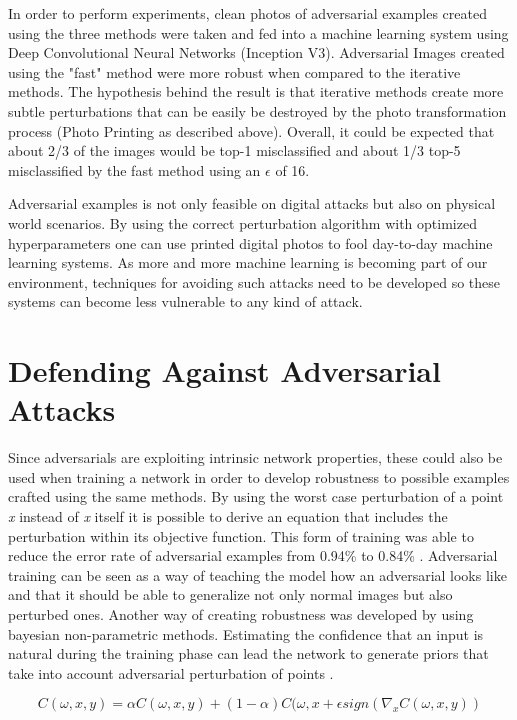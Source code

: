 In order to perform experiments, clean photos of adversarial examples created using the three methods were taken and fed into a machine learning system using Deep Convolutional Neural Networks (Inception V3). Adversarial Images created using the "fast" method were more robust when compared to the iterative methods. The hypothesis behind the result is that iterative methods create more subtle perturbations that can be easily be destroyed by the photo transformation process (Photo Printing as described above). Overall, it could be expected that about 2/3 of the images would be top-1 misclassified and about 1/3 top-5 misclassified by the fast method using an $\epsilon$ of 16.

Adversarial examples is not only feasible on digital attacks but also on physical world scenarios. By using the correct perturbation algorithm with optimized hyperparameters one can use printed digital photos to fool day-to-day machine learning systems. As more and more machine learning is becoming part of our environment, techniques for avoiding such attacks need to be developed so these systems can become less vulnerable to any kind of attack.

\section{Defending Against Adversarial Attacks}\label{sec:robustness}

Since adversarials are exploiting intrinsic network properties, these could also be used when training a network in order to develop robustness to possible examples crafted using the same methods. By using the worst case perturbation of a point \textit{x} instead of \textit{x} itself it is possible to derive an equation that includes the perturbation within its objective function. This form of training was able to reduce the error rate of adversarial examples from 0.94\% to 0.84\% \cite{goodfellow2014}. Adversarial training can be seen as a way of teaching the model how an adversarial looks like and that it should be able to generalize not only normal images but also perturbed ones. Another way of creating robustness was developed by using bayesian non-parametric methods. Estimating the confidence that an input is natural during the training phase can lead the network to generate priors that take into account adversarial perturbation of points \cite{billovits}. 

$$ C(\omega,x,y) = \alpha C(\omega ,x,y) + (1-\alpha )C(\omega ,x+\epsilon sign(\nabla_{x}C(\omega,x,y))$$

